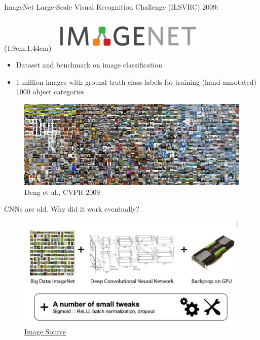 \documentclass[serif, aspectratio=169]{beamer}
\begin{document}
\begin{frame}{ImageNet Large-Scale Visual Recognition Challenge (ILSVRC)}
	2009:
	\begin{textblock*}{5cm}(1.9cm,1.44cm) %
		\includegraphics[keepaspectratio, scale=0.2]{pic/imagenet_logo}
	\end{textblock*}
	\begin{itemize}
		\item Dataset and benchmark on image classification
		\item 1 million images with ground truth class labels for training (hand-annotated) 1000 object categories
	\end{itemize}
	\begin{figure}[htpb]
		\begin{center}
			\includegraphics[keepaspectratio, scale=0.35]{pic/imagenet_images}
			\caption*{\scriptsize Deng et al., CVPR 2009}
		\end{center}
	\end{figure}
\end{frame}

\begin{frame}{CNNs are old. Why did it work eventually?}
	\begin{figure}[htpb]
		\begin{center}
			\includegraphics[keepaspectratio, scale=0.37]{pic/gpu}
			\caption*{\scriptsize \href{http://www.andreykurenkov.com/writing/ai/a-brief-history-of-neural-nets-and-deep-learning-part-4}{\color{blue}Image Source}}
		\end{center}
	\end{figure}
\end{frame}
\end{document}
